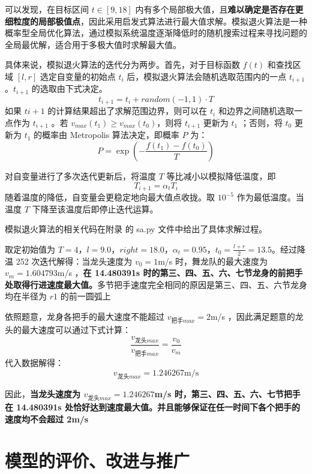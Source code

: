 \documentclass[a4paper]{article}
\begin{document}
		可以发现，在目标区间 $t \in [9, 18]$ 内有多个局部极大值，且\textbf{难以确定是否存在更细粒度的局部极值点}，因此采用启发式算法进行最大值求解。模拟退火算法是一种概率型全局优化算法，通过模拟系统温度逐渐降低时的随机搜索过程来寻找问题的全局最优解，适合用于多极大值时求解最大值。
		
		具体来说，模拟退火算法的迭代分为两步。首先，对于目标函数 $f(t)$ 和查找区域 $[l, r]$ 选定自变量的初始点 $t_i$ 后，模拟退火算法会随机选取范围内的一点 $t_{i+1}$ 。$t_{i+1}$ 的选取由下式决定。
		\begin{equation}
			t_{i+1} = t_i + random(-1, 1) \cdot T
		\end{equation}
		如果 $t{i+1}$ 的计算结果超出了求解范围边界，则可以在 $t_i$ 和边界之间随机选取一点作为 $t_{i+1}$ 。若 $v_{max}(t_1) \ge v_{max}(t_0)$，则将 $t_{i+1}$ 更新为 $t_1$ ；否则，将 $t_0$ 更新为 $t_1$ 的概率由 Metropolis 算法决定，即概率 $P$ 为：
		\begin{equation}
			P = \exp(-\dfrac{f(t_1) - f(t_0)}{T})
		\end{equation}
		
		对自变量进行了多次迭代更新后，将温度 $T$ 等比减小以模拟降低温度，即
		$$T_{i+1} = \alpha_t T_i$$
		随着温度的降低，自变量会更稳定地向最大值点收拢。取 $10^{-5}$ 作为最低温度。当温度 $T$ 下降至该温度后即停止迭代运算。
		
		模拟退火算法的相关代码在附录%
		的 sa.py 文件中给出了具体求解过程。
		
		取定初始值为 $T = 4$，$l=9.0$，$right=18.0$，$\alpha_t = 0.95$，$t_0 = \frac{l + r}{2} = 13.5$。经过降温 252 次迭代解得：当龙头速度为 $v_0 = 1$m/s 时，舞龙队的最大速度为 $v_m = 1.604793$m/s ，\textbf{在 14.480391s 时的第三、四、五、六、七节龙身的前把手处取得行进速度最大值。}多节把手速度完全相同的原因是第三、四、五、六节龙身均在半径为 $r1$ 的前一圆弧上
		
		依照题意，龙身各把手的最大速度不能超过 $v_{\text{把手}max} = 2$m/s ，因此满足题意的龙头的最大速度可以通过下式计算：
		$$ \dfrac{v_{\text{龙头}max}}{v_{\text{把手}max}} = \dfrac{v_0}{v_m} $$
		代入数据解得：
		\begin{equation}
			v_{\text{龙头}max} = 1.246267 \text{m/s}
		\end{equation}
		
		因此，\textbf{当龙头速度为 $v_{\text{龙头}max}= 1.246267$m/s 时，第三、四、五、六、七节把手在 14.480391s 处恰好达到速度最大值。并且能够保证在任一时间下各个把手的速度均不会超过 2m/s}
		
		
	\section{模型的评价、改进与推广}
\end{document}
